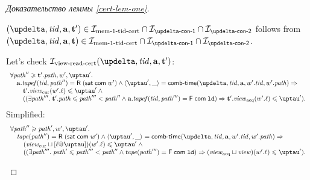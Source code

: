 \begin{proof}[Доказательство леммы \ref{cert-lem-one}]
\begin{itemize}
      $(\delta, \tId, \aT, \tT') \in \invMemZeroCERT \cap \invDeltaDefOne \cap \invDeltaDefTwo$ follows from
      $(\delta, \tId, \aT, \tT) \in \invMemZeroCERT \cap \invDeltaDefOne \cap \invDeltaDefTwo$.
      
      Let's check $\invViewReadCERT(\delta, \tId, \aT, \tT')$:
      \[\begin{array}{l}
  \forall \cpath'' \ge \tT'.\cpath, \w', \tau'. \\
\quad \aT.\tapef(\tId, \cpath'') = \tapeRead{(\tapeSatisfied{\Committed}{\w'})} \land
   \angled{\tau', \_} = \deltaHmap(\delta, \tId, \aT, \w'.\tId, \w'.\cpath) \Rightarrow \\
\quad \quad \tT'.\Rcur(\w'.\loc) \le \tau' \land {} \\
\quad \quad ((\exists \cpath'''. \; \tT'.\cpath \le \cpath''' < \cpath'' \land 
             \aT.\tapef(\tId, \cpath''') = \tapeFence{\Committed}{\LD}) \Rightarrow \tT'.\Racq(\w'.\loc) \le \tau'). \\
      \end{array}\]
      Simplified:
      \[\begin{array}{l}
  \forall \cpath'' \ge \cpath', \w', \tau'. \\
\quad \tape(\cpath'') = \tapeRead{(\tapeSatisfied{\Committed}{\w'})} \land
   \angled{\tau', \_} = \deltaHmap(\delta, \tId, \aT, \w'.\tId, \w'.\cpath) \Rightarrow \\
\quad \quad (\Rcur \sqcup [\loc @ \tau])(\w'.\loc) \le \tau' \land {} \\
\quad \quad ((\exists \cpath'''. \; \cpath' \le \cpath''' < \cpath'' \land 
             \tape(\cpath''') = \tapeFence{\Committed}{\LD}) \Rightarrow (\Racq \sqcup \R)(\w'.\loc) \le \tau'). \\
      \end{array}\]
      

\end{itemize}
\end{proof}
